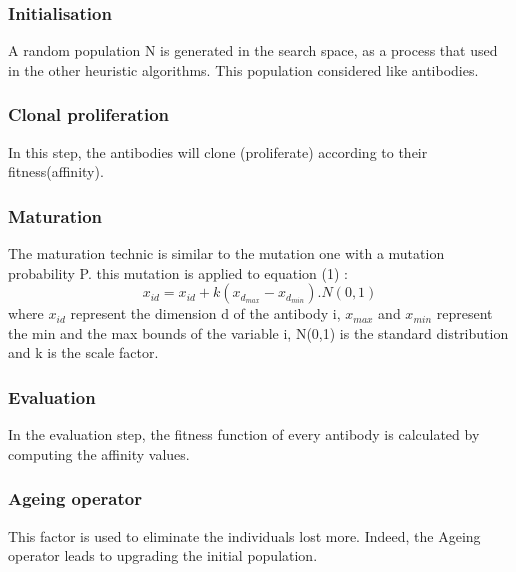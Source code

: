 \documentclass[conference]{IEEEtran}
\begin{document}
\subsubsection{Initialisation}
A random population N is generated in the search space, as a process that used in the other heuristic algorithms. This population considered like antibodies.
\subsubsection{Clonal proliferation}
In this step, the antibodies will clone (proliferate) according to their fitness(affinity).
\subsubsection{Maturation}
The maturation technic is similar to the mutation one with a mutation probability P. this mutation is applied to equation (1) : 
\begin{equation}
x_{id} = x_{id} + k(x_{d_{max}} - x_{d_{min}}) . N(0,1)
\end{equation}
where $x_{id}$ represent the dimension d of the antibody i, $x_{max}$ and $x_{min}$ represent the min and the max bounds of the variable i, N(0,1) is the standard distribution and k is the scale factor.
\subsubsection{Evaluation}
In the evaluation step, the fitness function of every antibody is calculated by computing the affinity values.
\subsubsection{Ageing operator}
This factor is used to eliminate the individuals lost more. Indeed, the Ageing operator leads to upgrading the initial population.
\end{document}
